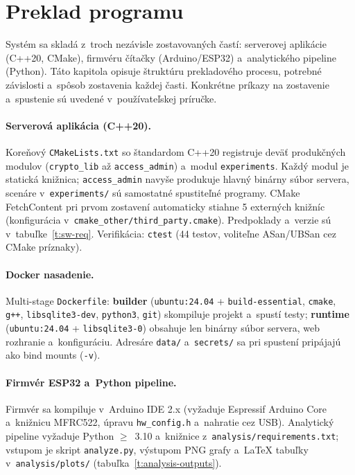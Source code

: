 \documentclass[a4paper]{feidipsp}
\begin{document}
\section{Preklad programu}

Systém sa skladá z~troch nezávisle zostavovaných častí: serverovej aplikácie (C++20, CMake), firmvéru čítačky (Arduino/ESP32) a~analytického pipeline (Python). Táto kapitola opisuje štruktúru prekladového procesu, potrebné závislosti a~spôsob zostavenia každej časti. Konkrétne príkazy na zostavenie a~spustenie sú uvedené v~používateľskej príručke.

\paragraph{Serverová aplikácia (C++20).}
Koreňový \texttt{CMakeLists.txt} so štandardom C++20 registruje deväť produkčných modulov (\texttt{crypto\_lib} až \texttt{access\_admin}) a~modul \texttt{experiments}. Každý modul je statická knižnica; \texttt{access\_admin} navyše produkuje hlavný binárny súbor servera, scenáre v~\texttt{experiments/} sú samostatné spustiteľné programy. CMake FetchContent pri prvom zostavení automaticky stiahne 5 externých knižníc (konfigurácia v~\texttt{cmake\_other/third\_party.cmake}). Predpoklady a~verzie sú v~tabuľke~\ref{t:sw-req}. Verifikácia: \texttt{ctest} (44 testov, voliteľne ASan/UBSan cez CMake príznaky).

\paragraph{Docker nasadenie.}
Multi-stage \texttt{Dockerfile}: \textbf{builder} (\texttt{ubuntu:24.04} + \texttt{build-essential}, \texttt{cmake}, \texttt{g++}, \texttt{libsqlite3-dev}, \texttt{python3}, \texttt{git}) skompiluje projekt a~spustí testy; \textbf{runtime} (\texttt{ubuntu:24.04} + \texttt{libsqlite3-0}) obsahuje len binárny súbor servera, web rozhranie a~konfiguráciu. Adresáre \texttt{data/} a~\texttt{secrets/} sa pri spustení pripájajú ako bind mounts (\texttt{-v}).

\paragraph{Firmvér ESP32 a~Python pipeline.}
Firmvér sa kompiluje v~Arduino IDE 2.x (vyžaduje Espressif Arduino Core a~knižnicu MFRC522, úpravu \texttt{hw\_config.h} a~nahratie cez USB). Analytický pipeline vyžaduje Python $\geq$~3.10 a~knižnice z~\texttt{analysis/requirements.txt}; vstupom je skript \texttt{analyze.py}, výstupom PNG grafy a~LaTeX tabuľky v~\texttt{analysis/plots/} (tabuľka~\ref{t:analysis-outputs}).
\end{document}
